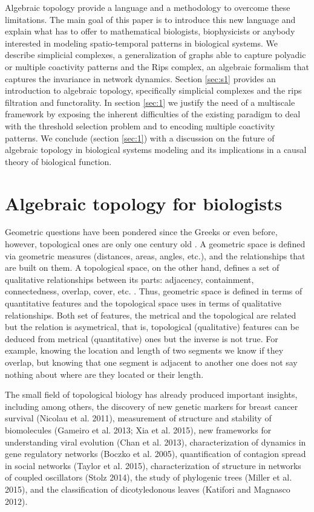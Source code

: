\documentclass[onecollarge,runningheads]{svjour2}
\begin{document}
Algebraic topology \cite{munkres1984elements} provide a language and a methodology to overcome these limitations.
The main goal of this paper is to introduce this new language and explain what has to offer to mathematical biologists, biophysicists or anybody interested in modeling spatio-temporal patterns in biological systems.
We describe simplicial complexes, a generalization of graphs able to capture polyadic or multiple coactivity patterns and the Rips complex, an algebraic formalism that captures the invariance in network dynamics. %
Section \ref{sec:s1} provides an introduction to algebraic topology, specifically simplicial complexes and the rips filtration and functorality. In section \ref{sec:1} we justify the need of a multiscale framework by exposing the inherent difficulties of the existing paradigm to deal with the threshold selection problem and to encoding multiple coactivity patterns.
We conclude (section \ref{sec:1}) with a discussion on the future of algebraic topology in biological systems modeling and its implications in a causal theory of biological function.

\section{Algebraic topology for biologists}
\label{se:s1}
Geometric questions have been pondered since the Greeks or even before, however, topological ones are only one century old  \cite{edelsbrunner2010computational}.  A geometric space is defined via geometric measures (distances, areas, angles, etc.), and the relationships that are built on them. A topological space, on the other hand, defines a set of qualitative relationships between its parts: adjacency, containment, connectedness, overlap, cover, etc. \cite{aleksandrov1999mathematics}. Thus, geometric space is defined in terms of quantitative features and the topological space uses  
in terms of qualitative relationships.  Both set of features, the metrical and the topological are related but the relation is asymetrical, that is, topological (qualitative) features can be deduced from metrical (quantitative) ones but the inverse is not true.   For example, knowing the location and length of two segments we know if they overlap, but knowing that one segment is adjacent to another one does not say nothing about where are they located or their length. 

The small field of topological biology has already produced important insights, including among others, the discovery of new genetic markers for breast cancer survival (Nicolau et al. 2011), measurement of structure and stability of biomolecules (Gameiro et al. 2013; Xia et al. 2015), new frameworks for understanding viral evolution (Chan et al. 2013), characterization of dynamics in gene regulatory networks (Boczko et al. 2005), quantification of contagion spread in social networks (Taylor et al. 2015), characterization of structure in networks of coupled oscillators (Stolz 2014), the study of phylogenic trees (Miller et al. 2015), and the classification of dicotyledonous leaves (Katifori and Magnasco 2012). 
\end{document}
